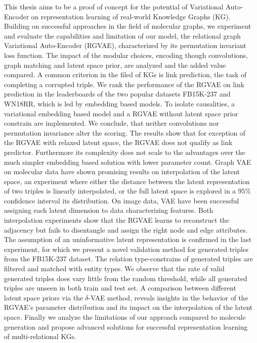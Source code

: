 \documentclass{article}
\makeatletter
\let\oldabstract\abstract
\let\oldendabstract\endabstract
\renewenvironment{abstract}
{\renewenvironment{quotation}%
               {\list{}{\addtolength{\leftmargin}{3em} %
                        \listparindent 1.5em%
                        \itemindent    \listparindent%
                        \rightmargin   \leftmargin%
                        \parsep        \z@ \@plus\p@}%
                \item\relax}%
               {\endlist}%
\oldabstract}
{\oldendabstract}
\makeatother
\begin{document}
\begin{abstract}

This thesis aims to be a proof of concept for the potential of Variational Auto-Encoder on representation learning of real-world Knowledge Graphs (KG). Building on successful approaches in the field of molecular graphs, we experiment and evaluate the capabilities and limitation of our model, the relational graph Variational Auto-Encoder (RGVAE), characterized by its permutation invariant loss function. The impact of the modular choices, encoding though convolutions, graph matching and latent space prior, are analyzed and the added value compared. A common criterion in the filed of KGs is link prediction, the task of completing a corrupted triple. We rank the performance of the RGVAE on link prediction in the leaderboards of the two popular datasets FB15K-237 and WN18RR, which is led by embedding based models. To isolate causalities, a variational embedding based model and a RGVAE without latent space prior constrain are implemented. We conclude, that neither convolutions nor permutation invariance alter the scoring. The results show that for exception of the RGVAE with relaxed latent space, the RGVAE does not qualify as link predictor. Furthermore its complexity does not scale to the advantages over the much simpler embedding based solution with lower parameter count.
Graph VAE on molecular data have shown promising results on interpolation of the latent space, an experiment where either the distance between the latent representation of two triples is linearly interpolated, or the full latent space is explored in a $95$\% confidence interval its distribution. On image data, VAE have been successful assigning each latent dimension to data characterizing features. Both interpolation experiments show that the RGVAE learns to reconstruct the adjacency but fails to disentangle and assign the right node and edge attributes. The assumption of an uninformative latent representation is confirmed in the last experiment, for which we present a novel validation method for generated triples from the FB15K-237 dataset. The relation type-constrains of generated triples are filtered and matched with entity types. We observe that the rate of valid generated triples does vary little from the random threshold, while all generated triples are unseen in both train and test set. A comparison between different latent space priors via the $\delta$-VAE method, reveals insights in the behavior of the RGVAE's parameter distribution and its impact on the interpolation of the latent space. Finally we analyze the limitations of our approach compared to molecule generation and propose advanced solutions for successful representation learning of multi-relational KGs. 
\end{abstract}
\newpage
\end{document}
